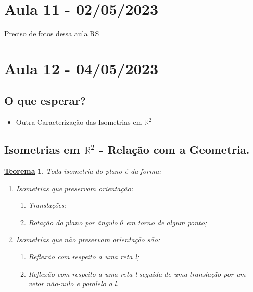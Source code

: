\documentclass{article}
\newtheorem*{theorem*}{\underline{Teorema}}
\begin{document}
\section{Aula 11 - 02/05/2023}
  Preciso de fotos dessa aula RS
\newpage
\section{Aula 12 - 04/05/2023}
\subsection{O que esperar?}
\begin{itemize}
  \item Outra Caracterização das Isometrias em $\mathbb{R}^{2}$
\end{itemize}
\subsection{Isometrias em $\mathbb{R}^{2}$ - Relação com a Geometria.}
\begin{theorem*}
  Toda isometria do plano é da forma:
 \begin{enumerate}
   \item Isometrias que preservam orientação:
    \begin{enumerate}
      \item Translações;
      \item Rotação do plano por ângulo $\theta $ em torno de algum ponto;
    \end{enumerate}
  \item Isometrias que não preservam orientação são:
   \begin{enumerate}
     \item[(c)] Reflexão com respeito a uma reta l;
     \item[(d)] Reflexão com respeito a uma reta l seguida de uma translação por um vetor não-nulo e
       paralelo a l.
   \end{enumerate}
 \end{enumerate}
\end{theorem*}
\end{document}
